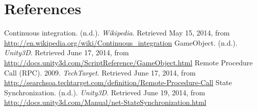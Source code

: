 \documentclass[11pt,twoside,a4paper]{article}
\begin{document}
\clearpage

\section*{References}
Continuous integration. (n.d.). \textit{Wikipedia}. Retrieved May 15, 2014, from \url{http://en.wikipedia.org/wiki/Continuous_integration}
\newline \newline
GameObject. (n.d.). \textit{Unity3D}. Retrieved June 17, 2014, from \url{http://docs.unity3d.com/ScriptReference/GameObject.html}
\newline \newline
Remote Procedure Call (RPC). 2009. \textit{TechTarget}. Retrieved June 17, 2014, from \url{http://searchsoa.techtarget.com/definition/Remote-Procedure-Call}
\newline \newline
State Synchronization. (n.d.). \textit{Unity3D}. Retrieved June 19, 2014, from \url{http://docs.unity3d.com/Manual/net-StateSynchronization.html}
\end{document}
